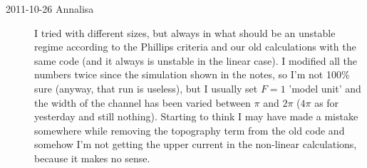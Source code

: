 \begin{description}
\item[2011-10-26 Annalisa]
I tried with different sizes, but always in what should be an unstable
regime according to the Phillips criteria and our old calculations with
the same code (and it always is unstable in the linear case). I modified
all the numbers twice since the simulation shown in the notes, so I'm not
100\% sure (anyway, that run is useless), but I usually set $F= 1$ 'model
unit'  and the width of the channel has been varied between $\pi$ and
$2\pi$  ($4\pi$  as for yesterday and still nothing). Starting to think I
may have made a mistake somewhere while removing the topography term from
the old code and somehow I'm not getting the upper current in the
non-linear calculations, because it makes no sense.

\end{description}
